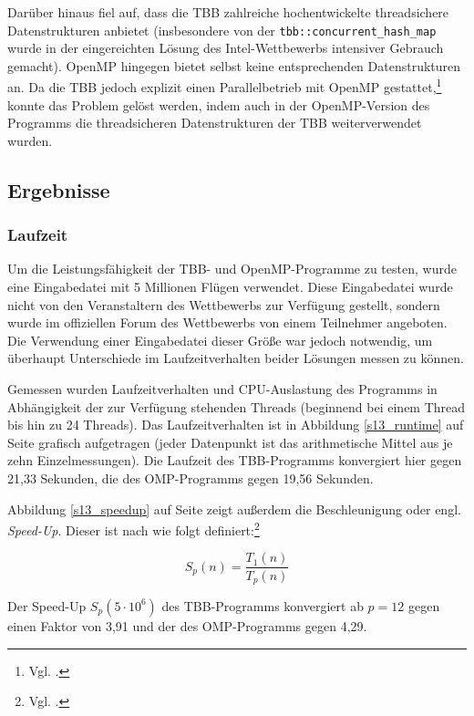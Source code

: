 \documentclass[11pt]{scrartcl}
\begin{document}
Darüber hinaus fiel auf, dass die TBB zahlreiche hochentwickelte threadsichere Datenstrukturen anbietet (insbesondere
von der \texttt{tbb::concurrent\_hash\_map} wurde in der eingereichten Lösung des Intel-Wettbewerbs intensiver Gebrauch
gemacht). OpenMP hingegen bietet selbst keine entsprechenden Datenstrukturen an. Da die TBB jedoch explizit einen
Parallelbetrieb mit OpenMP gestattet,\footnote{Vgl. \cite{intel_mixing_2012}.} konnte das Problem gelöst werden, indem
auch in der OpenMP-Version des Programms die threadsicheren Datenstrukturen der TBB weiterverwendet wurden.

\subsection{Ergebnisse}

\subsubsection{Laufzeit}

Um die Leistungsfähigkeit der TBB- und OpenMP-Programme zu testen, wurde eine Eingabedatei mit 5 Millionen Flügen verwendet. Diese Eingabedatei wurde nicht von den Veranstaltern des Wettbewerbs zur Verfügung gestellt, sondern wurde im offiziellen Forum des Wettbewerbs von einem Teilnehmer angeboten. Die Verwendung einer Eingabedatei dieser Größe war jedoch notwendig, um überhaupt Unterschiede im Laufzeitverhalten beider Lösungen messen zu können.

Gemessen wurden Laufzeitverhalten und CPU-Auslastung des Programms in Abhängigkeit der zur Verfügung stehenden Threads (beginnend bei einem Thread bis hin zu 24 Threads). Das Laufzeitverhalten ist in Abbildung \ref{s13_runtime} auf Seite \pageref{s13_runtime} grafisch aufgetragen (jeder Datenpunkt ist das arithmetische Mittel aus je zehn Einzelmessungen). Die Laufzeit des TBB-Programms konvergiert hier gegen 21,33 Sekunden, die des OMP-Programms gegen 19,56 Sekunden.

Abbildung \ref{s13_speedup} auf Seite \pageref{s13_speedup} zeigt außerdem die Beschleunigung oder engl. \emph{Speed-Up}. Dieser ist nach  wie folgt definiert:\footnote{Vgl. \cite[S.~162]{rauber_parallel_2010}.}

\begin{equation}
S_p(n) = \frac{T_1(n)}{T_p(n)}
\end{equation}

Der Speed-Up $S_p(5\cdot 10^6)$ des TBB-Programms konvergiert ab $p=12$ gegen einen Faktor von 3,91 und der des OMP-Programms gegen 4,29.
\end{document}

